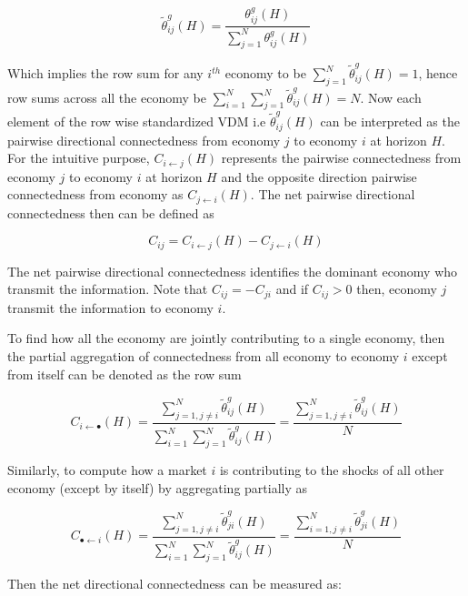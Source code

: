 \documentclass[]{elsarticle} %
\begin{document}
\[\tilde{\theta }_{ij}^{g}\left( H \right)=\frac{\theta _{ij}^{g}\left( H \right)}{\sum\nolimits_{j=1}^{N}{\theta _{ij}^{g}\left( H \right)}}\]

Which implies the row sum for any \({{i}^{th}}\) economy to be
\(\sum\nolimits_{j=1}^{N}{\tilde{\theta }_{ij}^{g}\left( H \right)}=1\),
hence row sums across all the economy be
\(\sum\nolimits_{i=1}^{N}{\sum\nolimits_{j=1}^{N}{\tilde{\theta }_{ij}^{g}\left( H \right)}}=N\).
Now each element of the row wise standardized VDM i.e
\({\tilde \theta _{ij}^g\left( H \right)}\) can be interpreted as the
pairwise directional connectedness from economy \(j\) to economy \(i\)
at horizon \(H\). For the intuitive purpose,
\({{C}_{i\leftarrow j}}\left( H \right)\) represents the pairwise
connectedness from economy \(j\) to economy \(i\) at horizon \(H\) and
the opposite direction pairwise connectedness from economy as
\({{C}_{j\leftarrow i}}\left( H \right)\). The net pairwise directional
connectedness then can be defined as

\[{{C}_{ij}}={{C}_{i\leftarrow j}}\left( H \right)-{{C}_{j\leftarrow i}}\left( H \right)\]

The net pairwise directional connectedness identifies the dominant
economy who transmit the information. Note that
\({{C}_{ij}}=-{{C}_{ji}}\) and if \({{C}_{ij}}>0\) then, economy
\(j\)transmit the information to economy \(i\).

To find how all the economy are jointly contributing to a single
economy, then the partial aggregation of connectedness from all economy
to economy \(i\) except from itself can be denoted as the row sum

\[{{C}_{i\leftarrow \bullet }}\left( H \right)=\frac{\sum\nolimits_{j=1,j\ne i}^{N}{\tilde{\theta }_{ij}^{g}\left( H \right)}}{\sum\nolimits_{i=1}^{N}{\sum\nolimits_{j=1}^{N}{\tilde{\theta }_{ij}^{g}\left( H \right)}}}=\frac{\sum\nolimits_{j=1,j\ne i}^{N}{\tilde{\theta }_{ij}^{g}\left( H \right)}}{N}\]

Similarly, to compute how a market \(i\) is contributing to the shocks
of all other economy (except by itself) by aggregating partially as

\[{{C}_{\bullet \leftarrow i}}\left( H \right)=\frac{\sum\nolimits_{j=1,j\ne i}^{N}{\tilde{\theta }_{ji}^{g}\left( H \right)}}{\sum\nolimits_{i=1}^{N}{\sum\nolimits_{j=1}^{N}{\tilde{\theta }_{ij}^{g}\left( H \right)}}}=\frac{\sum\nolimits_{i=1,j\ne i}^{N}{\tilde{\theta }_{ji}^{g}\left( H \right)}}{N}\]

Then the net directional connectedness can be measured as:
\end{document}
